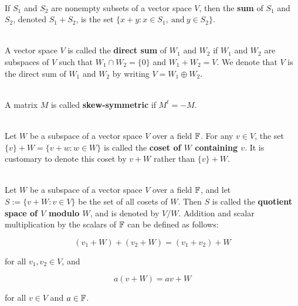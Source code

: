 \begin{definition}
	\hfill\\
	If $S_1$ and $S_2$ are nonempty subsets of a vector space $V$, then the \textbf{sum} of $S_1$ and $S_2$, denoted $S_1 + S_2$, is the set $\{x + y : x \in S_1,\ \text{and}\ y \in S_2\}$.
\end{definition}

\begin{definition}
	\hfill\\
	A vector space $V$ is called the \textbf{direct sum} of $W_1$ and $W_2$ if $W_1$ and $W_2$ are subspaces of $V$ such that $W_1 \cap W_2 = \{0\}$ and $W_1 + W_2 = V$. We denote that $V$ is the direct sum of $W_1$ and $W_2$ by writing $V = W_1 \oplus W_2$.
\end{definition}

\begin{definition}
	\hfill\\
	A matrix $M$ is called \textbf{skew-symmetric} if $M^t = -M$.
\end{definition}

\begin{definition}
	\hfill\\
	Let $W$ be a subspace of a vector space $V$ over a field $\mathbb{F}$. For any $v \in V$, the set $\{v\} + W = \{v + w : w \in W\}$ is called the \textbf{coset of $W$ containing $v$}. It is customary to denote this coset by $v + W$ rather than $\{v\} + W$.
\end{definition}

\begin{definition}
	\hfill\\
	Let $W$ be a subspace of a vector space $V$ over a field $\mathbb{F}$, and let $S := \{v + W : v \in V\}$ be the set of all cosets of $W$. Then $S$ is called the \textbf{quotient space of $V$ modulo $W$}, and is denoted by $V/W$. Addition and scalar multiplication by the scalars of $\mathbb{F}$ can be defined as follows:

	\[(v_1 + W) + (v_2 + W) = (v_1 + v_2) + W\]

	for all $v_1, v_2 \in V$, and

	\[a(v + W) = av + W\]

	for all $v \in V$ and $a \in \mathbb{F}$.
\end{definition}
